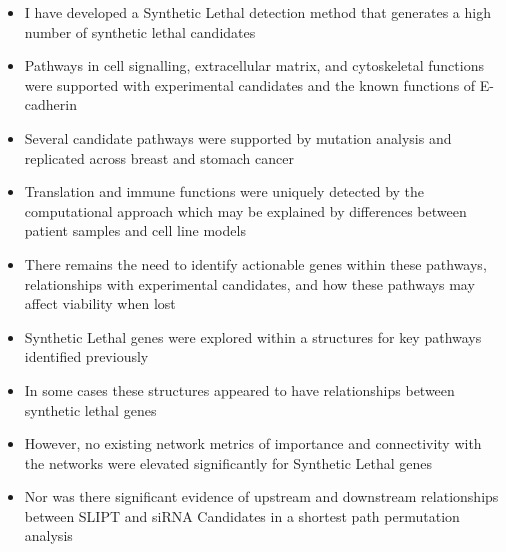    \begin{itemize}
   \item I have developed a Synthetic Lethal detection method that generates a high number of \gls{synthetic lethal} candidates
   
   \bigskip
   
   \item Pathways in cell signalling, extracellular matrix, and cytoskeletal functions were supported with experimental candidates and the known functions of \gls{E-cadherin}
   
   \bigskip
   
   \item Several candidate pathways were supported by \gls{mutation} analysis and replicated across breast and stomach cancer
   
   \bigskip
   
   \item Translation and immune functions were uniquely detected by the computational approach which may be explained by differences between patient samples and cell line models
   
   \bigskip
   
   \item There remains the need to identify actionable genes within these pathways, relationships with experimental candidates, and how these pathways may affect viability when lost
  \end{itemize}
  
    \begin{itemize}
   \item Synthetic Lethal genes were explored within a  structures for key pathways identified previously 
   
   \bigskip
   
   \item In some cases these  structures appeared to have relationships between \gls{synthetic lethal} genes  
   
   \bigskip
   
   \item However, no existing network metrics of importance and connectivity with the networks were elevated significantly for Synthetic Lethal genes
   
   \bigskip
   
   \item Nor was there significant evidence of upstream and downstream relationships between SLIPT and \gls{siRNA} Candidates in a \gls{shortest path} permutation analysis
  \end{itemize}
  
